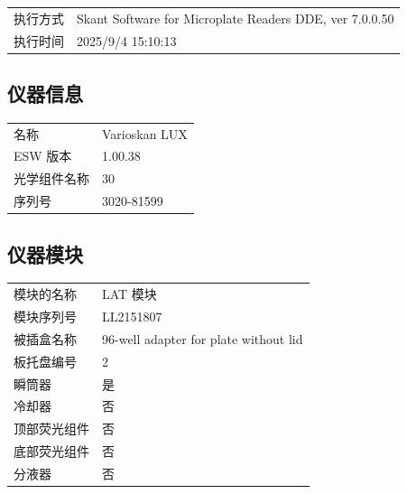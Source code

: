 \documentclass[UTF8,10pt,a4paper,fontset=fandol]{ctexart}
\newcommand{\fieldvalue}[1]{#1}
\begin{document}
\begin{tabular}{@{}ll@{}}
执行方式 &
\fieldvalue{Skant Software for Microplate Readers DDE, ver 7.0.0.50} \\
执行时间 &
\fieldvalue{2025/9/4 15:10:13}
\end{tabular}

\subsection*{仪器信息}

\begin{tabular}{@{}ll@{}}
名称 &
\fieldvalue{Varioskan LUX} \\
ESW 版本 &
\fieldvalue{1.00.38} \\
光学组件名称 &
\fieldvalue{30} \\
序列号 &
\fieldvalue{3020-81599}
\end{tabular}

\subsection*{仪器模块}

\begin{tabular}{@{}ll@{}}
模块的名称 &
\fieldvalue{LAT 模块} \\
模块序列号 &
\fieldvalue{LL2151807} \\
被插盒名称 &
\fieldvalue{96-well adapter for plate without lid} \\
板托盘编号 &
\fieldvalue{2} \\
瞬筒器 &
\fieldvalue{是} \\
冷却器 &
\fieldvalue{否} \\
顶部荧光组件 &
\fieldvalue{否} \\
底部荧光组件 &
\fieldvalue{否} \\
分液器 &
\fieldvalue{否}
\end{tabular}
\end{document}
